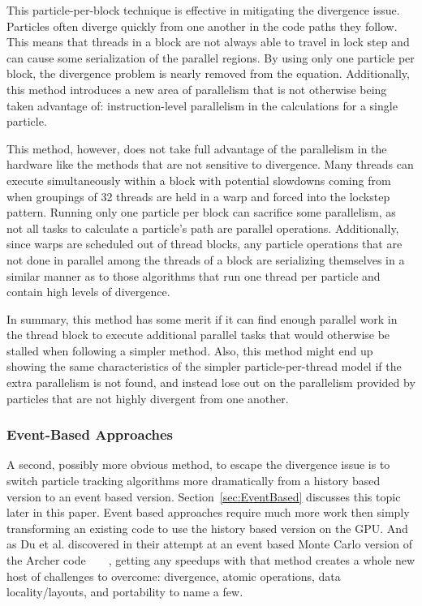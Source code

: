 This particle-per-block technique is effective in mitigating the divergence issue.
%
Particles often diverge quickly from one another in the code paths they follow.
%
This means that threads in a block are not always able to travel in lock step and can cause some serialization of the parallel regions.
%
By using only one particle per block, the divergence problem is nearly removed from the equation.
%
Additionally, this method introduces a new area of parallelism that is not otherwise being taken advantage of: instruction-level parallelism in the calculations for a single particle.
%

%
This method, however, does not take full advantage of the parallelism in the hardware like the methods that are not sensitive to divergence.
%
Many threads can execute simultaneously within a block with potential slowdowns coming from when groupings of 32 threads are held in a warp and forced into the lockstep pattern.
%
Running only one particle per block can sacrifice some parallelism, as not all tasks to calculate a particle's path are parallel operations.
%
Additionally, since warps are scheduled out of thread blocks, any particle operations that are not done in parallel among the threads of a block are serializing themselves in a similar manner as to those algorithms that run one thread per particle and contain high levels of divergence.
%

In summary, this method has some merit if it can find enough parallel work in the thread block to execute additional parallel tasks that would otherwise be stalled when following a simpler method.
%
Also, this method might end up showing the same characteristics of the simpler particle-per-thread model if the extra parallelism is not found, and instead lose out on the parallelism provided by particles that are not highly divergent from one another. 

\subsubsection*{\textbf{Event-Based Approaches}}

A second, possibly more obvious method, to escape the divergence issue is to switch particle tracking algorithms more dramatically from a history based version to an event based version.
%
Section~\ref{sec:EventBased} discusses this topic later in this paper.
%
Event based approaches require much more work then simply transforming an existing code to use the history based version on the GPU.
%
And as Du et al. discovered in their attempt at an event based Monte Carlo version of the Archer code~\cite{xu2015archer}~\cite{du2013evaluation}~\cite{liu2015comparison}~\cite{su2013monte},  getting any speedups with that method creates a whole new host of challenges to overcome: divergence, atomic operations, data locality/layouts, and portability to name a few.


